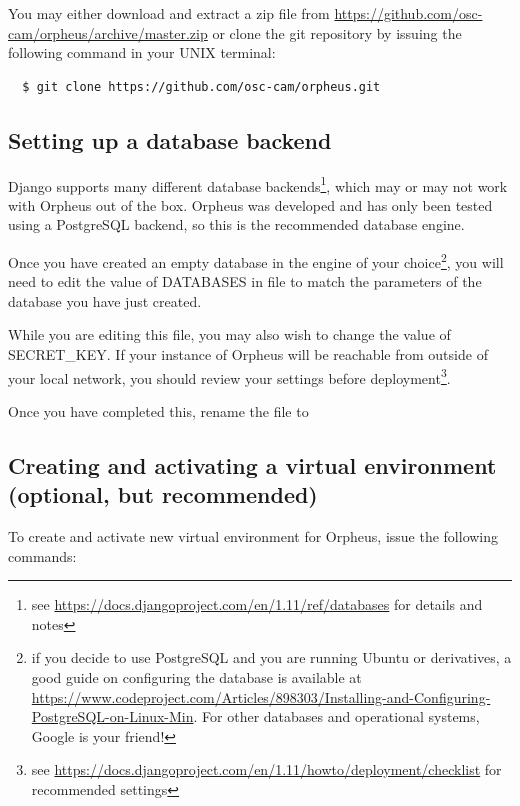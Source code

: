 \documentclass[british, 12pt]{article}
\begin{document}
You may either download and extract a zip file from \url{https://github.com/osc-cam/orpheus/archive/master.zip} or clone the git repository by issuing the following command in your UNIX terminal:

\begin{lstlisting}
  $ git clone https://github.com/osc-cam/orpheus.git
\end{lstlisting}

\subsection{Setting up a database backend}

Django supports many different database backends\footnote{see \url{https://docs.djangoproject.com/en/1.11/ref/databases} for details and notes}, which may or may not work with Orpheus out of the box. Orpheus was developed and has only been tested using a PostgreSQL backend, so this is the recommended database engine.

Once you have created an empty database in the engine of your choice\footnote{if you decide to use PostgreSQL and you are running Ubuntu or derivatives, a good guide on configuring the database is available at \url{https://www.codeproject.com/Articles/898303/Installing-and-Configuring-PostgreSQL-on-Linux-Min}. For other databases and operational systems, Google is your friend!}, you will need to edit the value of \mbox{DATABASES} in file  to match the parameters of the database you have just created.

While you are editing this file, you may also wish to change the value of \mbox{SECRET\_KEY}. If your instance of Orpheus will be reachable from outside of your local network, you should review your settings before deployment\footnote{see \url{https://docs.djangoproject.com/en/1.11/howto/deployment/checklist} for recommended settings}.

Once you have completed this, rename the file  to 

\subsection{Creating and activating a virtual environment (optional, but recommended)}

To create and activate new virtual environment for Orpheus, issue the following commands:
\end{document}
